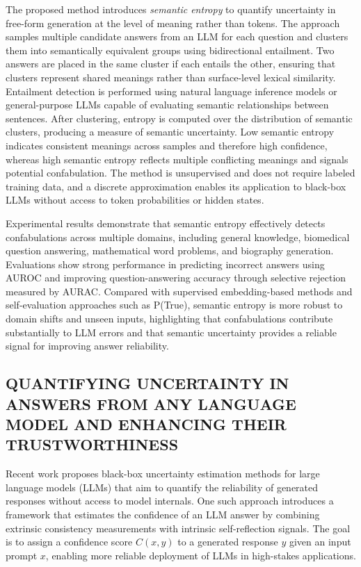 The proposed method introduces \textit{semantic entropy} to quantify uncertainty in free-form generation at the level of meaning rather than tokens. The approach samples multiple candidate answers from an LLM for each question and clusters them into semantically equivalent groups using bidirectional entailment. Two answers are placed in the same cluster if each entails the other, ensuring that clusters represent shared meanings rather than surface-level lexical similarity. Entailment detection is performed using natural language inference models or general-purpose LLMs capable of evaluating semantic relationships between sentences. After clustering, entropy is computed over the distribution of semantic clusters, producing a measure of semantic uncertainty. Low semantic entropy indicates consistent meanings across samples and therefore high confidence, whereas high semantic entropy reflects multiple conflicting meanings and signals potential confabulation. The method is unsupervised and does not require labeled training data, and a discrete approximation enables its application to black-box LLMs without access to token probabilities or hidden states.

Experimental results demonstrate that semantic entropy effectively detects confabulations across multiple domains, including general knowledge, biomedical question answering, mathematical word problems, and biography generation. Evaluations show strong performance in predicting incorrect answers using AUROC and improving question-answering accuracy through selective rejection measured by AURAC. Compared with supervised embedding-based methods and self-evaluation approaches such as P(True), semantic entropy is more robust to domain shifts and unseen inputs, highlighting that confabulations contribute substantially to LLM errors and that semantic uncertainty provides a reliable signal for improving answer reliability.


\subsection{QUANTIFYING UNCERTAINTY IN ANSWERS FROM ANY LANGUAGE MODEL AND ENHANCING THEIR TRUSTWORTHINESS}

Recent work proposes black-box uncertainty estimation methods for large language models (LLMs) that aim to quantify the reliability of generated responses without access to model internals. One such approach introduces a framework that estimates the confidence of an LLM answer by combining extrinsic consistency measurements with intrinsic self-reflection signals. The goal is to assign a confidence score $C(x,y)$ to a generated response $y$ given an input prompt $x$, enabling more reliable deployment of LLMs in high-stakes applications.

